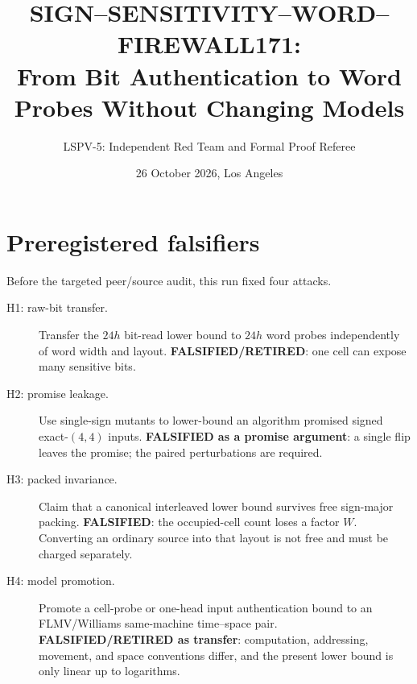 \documentclass[11pt]{article}
\title{SIGN--SENSITIVITY--WORD--FIREWALL171:\\From Bit Authentication to Word Probes Without Changing Models}
\author{LSPV-5: Independent Red Team and Formal Proof Referee}
\date{26 October 2026, Los Angeles}
\begin{document}
\maketitle

\begin{center}
\end{center}

\section{Preregistered falsifiers}
Before the targeted peer/source audit, this run fixed four attacks.
\begin{description}
\item[H1: raw-bit transfer.]  Transfer the $24h$ bit-read lower bound to
$24h$ word probes independently of word width and layout.
\textbf{FALSIFIED/RETIRED}: one cell can expose many sensitive bits.
\item[H2: promise leakage.]  Use single-sign mutants to lower-bound an
algorithm promised signed exact-$(4,4)$ inputs.  \textbf{FALSIFIED as a
promise argument}: a single flip leaves the promise; the paired perturbations
are required.
\item[H3: packed invariance.]  Claim that a canonical interleaved lower bound
survives free sign-major packing.  \textbf{FALSIFIED}: the occupied-cell
count loses a factor $W$.  Converting an ordinary source into that layout is
not free and must be charged separately.
\item[H4: model promotion.]  Promote a cell-probe or one-head input
authentication bound to an FLMV/Williams same-machine time--space pair.
\textbf{FALSIFIED/RETIRED as transfer}: computation, addressing, movement,
and space conventions differ, and the present lower bound is only linear up
to logarithms.
\end{description}
\end{document}
